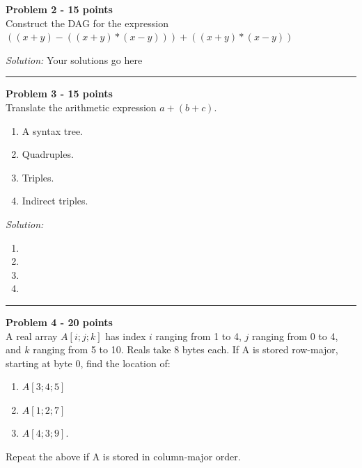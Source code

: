 \documentclass[a4paper, 11pt]{article}
\newenvironment{problem}[2][Problem]
    { \begin{mdframed}[backgroundcolor=gray!20] \textbf{#1 #2} \\}
    {  \end{mdframed}}
\newenvironment{solution}
    {\textit{Solution:}}
    {}
\begin{document}

\begin{problem}{2 - 15 points}
Construct the DAG for the expression  $((x + y )-((x + y )* ( x - y ))) + ((x + y ) * ( x -  y ))$


\end{problem}
\begin{solution}
Your solutions go here

\end{solution} 
\noindent\rule{7in}{2.8pt}


\begin{problem}{3 - 15 points}
Translate the arithmetic expression $a + ( b + c )$. 

\begin{enumerate}[a]
    \item A syntax tree.  
    \item Quadruples. 
    \item Triples.  
    \item Indirect triples. 
\end{enumerate}
\end{problem}

\begin{solution}
\begin{enumerate}[a]
    \item  
    \item 
    \item
    \item
\end{enumerate}
\end{solution} 

\noindent\rule{7in}{2.8pt}

\begin{problem}{4 - 20 points}
A real array $A [i; j; k]$ has index $i$ ranging from 1 to 4, $j$  ranging from 0 to 4, and $k$ ranging from 5 to 10. Reals take 8 bytes each. If A  is stored row-major, starting at byte 0, find the location of:  

\begin{enumerate}[a]
    \item $A [3; 4 ; 5]$
    \item $A [1; 2 ; 7]$
    \item $A [4; 3 ; 9].$
\end{enumerate} 
Repeat the above if A is stored in column-major order.

\end{problem}
\end{document}
